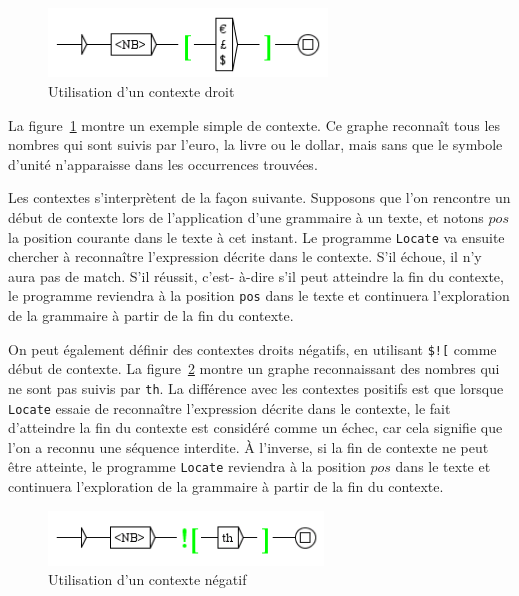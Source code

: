 \bigskip
\begin{figure}[!h]
\begin{center}
\includegraphics[width=7.4cm]{resources/img/fig6-12.png}
\caption{Utilisation d’un contexte droit\label{fig-context1}}
\end{center}
\end{figure}

\bigskip
\noindent La figure~\ref{fig-context1} montre un exemple simple de contexte. Ce graphe
reconnaît tous les nombres qui sont suivis par l’euro, la livre ou le dollar, mais sans
que le symbole d’unité n’apparaisse dans les occurrences trouvées.

\bigskip
\noindent Les contextes s’interprètent de la façon suivante. Supposons que l’on rencontre un début
de contexte lors de l’application d’une grammaire à un texte, et notons $pos$ la position courante
dans le texte à cet instant. Le programme \verb$Locate$ va ensuite chercher à reconnaître
l’expression décrite dans le contexte. S’il échoue, il n’y aura pas de match. S’il réussit, c’est-
à-dire s’il peut atteindre la fin du contexte, le programme reviendra à la position \verb$pos$ dans
le texte et continuera l’exploration de la grammaire à partir de la fin du contexte.


\bigskip
\noindent On peut également définir des contextes droits négatifs, en utilisant
 \verb+$![+ comme début de contexte. La figure~\ref{fig-context2}
montre un graphe reconnaissant des nombres qui ne sont pas suivis par \verb+th+.
 La différence avec les contextes positifs est que lorsque \verb$Locate$ essaie de reconnaître
 l’expression décrite dans le contexte, le fait d’atteindre la fin du
 contexte est considéré comme un échec, car cela signifie que l’on a reconnu une séquence interdite.
 À l’inverse, si la fin de contexte ne peut être atteinte, le programme \verb$Locate$ reviendra à
 la position $pos$ dans le texte et continuera l’exploration de la grammaire à partir de la fin du
 contexte.

\bigskip
\begin{figure}[!h]
\begin{center}
\includegraphics[width=7.3cm]{resources/img/fig6-13.png}
\caption{Utilisation d’un contexte négatif\label{fig-context2}}
\end{center}
\end{figure}

